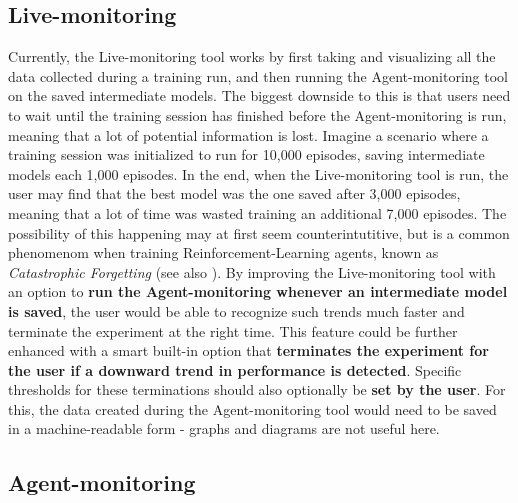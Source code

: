 \subsection*{Live-monitoring}\label{subsec:FutureLiveMonitoring}

Currently, the Live-monitoring tool works by first taking and visualizing all the data collected during a training run, and then running the Agent-monitoring tool on the saved intermediate models. The biggest downside to this is that users need to wait until the training session has finished before the Agent-monitoring is run, meaning that a lot of potential information is lost. Imagine a scenario where a training session was initialized to run for 10,000 episodes, saving intermediate models each 1,000 episodes. In the end, when the Live-monitoring tool is run, the user may find that the best model was the one saved after 3,000 episodes, meaning that a lot of time was wasted training an additional 7,000 episodes. The possibility of this happening may at first seem counterintutitive, but is a common phenomenom when training Reinforcement-Learning agents, known as \emph{Catastrophic Forgetting} (see also \cite{CatastrophicForgetting}). By improving the Live-monitoring tool with an option to \textbf{run the Agent-monitoring whenever an intermediate model is saved}, the user would be able to recognize such trends much faster and terminate the experiment at the right time. This feature could be further enhanced with a smart built-in option that \textbf{terminates the experiment for the user if a downward trend in performance is detected}. Specific thresholds for these terminations should also optionally be \textbf{set by the user}. For this, the data created during the Agent-monitoring tool would need to be saved in a machine-readable form - graphs and diagrams are not useful here.

\subsection*{Agent-monitoring}\label{subsec:FutureAgentMonitoring}

